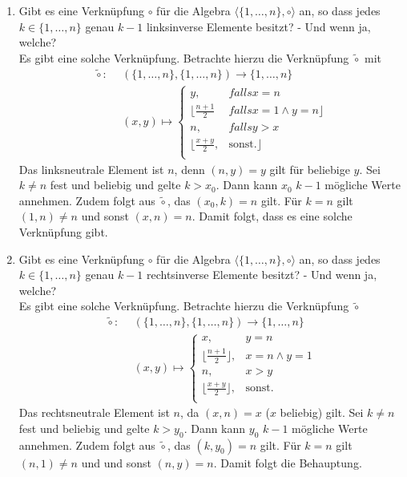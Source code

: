 \begin{enumerate}[label=(\alph*)]
        \item
         Gibt es eine Verknüpfung $\circ$ für die Algebra $\langle \{1, \dots, n\}, \circ \rangle$ an, so dass jedes $k \in \{1,\dots,n\}$ genau $k-1$ linksinverse Elemente besitzt? - Und wenn ja, welche?\\
         Es gibt eine solche Verknüpfung.
         Betrachte hierzu die Verknüpfung $\tilde{\circ}$  mit
         \begin{align*}
         \tilde{\circ}: ~~ & (\{1,\dots , n\},\{1,\dots, n\}) \rightarrow  \{1,\dots, n\}\\
         & (x,y) \mapsto \begin{cases}
         y, & falls x=n  \\
        \lfloor{\frac{n+1}{2}} & falls x = 1 \land y =n\rfloor \\
        n, & falls y > x\\
        \lfloor{\frac{x+y}{2}}, & \text{sonst.}\rfloor \\
        \end{cases}
        \end{align*}
        Das linksneutrale Element ist $n$, denn $(n,y)=y$ gilt für beliebige $y$. Sei $k\ne n$ fest und beliebig und gelte $k > x_0$. Dann kann $x_0$ $k-1$ mögliche Werte annehmen. Zudem folgt aus $\tilde{\circ}$, das $(x_0,k)=n$ gilt. Für $k = n$ gilt $(1,n) \ne n$ und sonst $(x,n) = n$. Damit folgt, dass es eine solche Verknüpfung gibt.       
        
        \item         
         Gibt es eine Verknüpfung $\circ$ für die Algebra $\langle \{1, \dots, n\}, \circ \rangle$ an, so dass jedes $k \in \{1,\dots,n\}$ genau $k-1$ rechtsinverse Elemente besitzt? - Und wenn ja, welche?\\
         Es gibt eine solche Verknüpfung. Betrachte hierzu die Verknüpfung $\tilde{\circ}$ 
         \begin{align*}
         \tilde{\circ}: ~~ & (\{1,\dots , n\},\{1,\dots, n\}) \rightarrow  \{1,\dots, n\}\\
         & (x,y) \mapsto \begin{cases}
         x, & y=n  \\
         \lfloor{\frac{n+1}{2}}\rfloor, & x = n \land y =1\\
         n, & x > y\\
         \lfloor{\frac{x+y}{2}}\rfloor, & \text{sonst.}\\
         \end{cases}
         \end{align*}
         Das rechtsneutrale Element ist $n$, da $(x,n)=x$ ($x$ beliebig) gilt. Sei $k\ne n$ fest und beliebig und gelte $k > y_0$. Dann kann $y_0$ $k-1$ mögliche Werte annehmen. Zudem folgt aus $\tilde{\circ}$, das $(k,y_0)=n$ gilt. Für $k = n$ gilt $(n,1) \ne n$ und und sonst $(n,y) = n$. Damit folgt die Behauptung.
    \end{enumerate}
